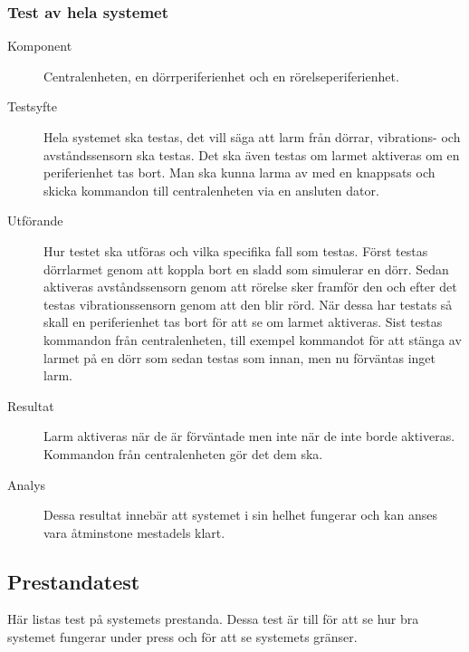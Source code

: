 \documentclass[a4paper]{article}
\begin{document}
\subsubsection{Test av hela systemet}
\begin{description}
\item[Komponent] Centralenheten, en dörrperiferienhet och en rörelseperiferienhet.

\item[Testsyfte] Hela systemet ska testas, det vill säga att larm från dörrar, vibrations- och avståndssensorn ska testas.
Det ska även testas om larmet aktiveras om en periferienhet tas bort.
Man ska kunna larma av med en knappsats och skicka kommandon till centralenheten via en ansluten dator.

\item[Utförande] Hur testet ska utföras och vilka specifika fall som testas.
Först testas dörrlarmet genom att koppla bort en sladd som simulerar en dörr.
Sedan aktiveras avståndssensorn genom att rörelse sker framför den och efter det testas vibrationssensorn genom att den blir rörd.
När dessa har testats så skall en periferienhet tas bort för att se om larmet aktiveras.
Sist testas kommandon från centralenheten, till exempel kommandot för att stänga av larmet på en dörr som sedan testas som innan, men nu förväntas inget larm.

\item[Resultat] Larm aktiveras när de är förväntade men inte när de inte borde aktiveras.
Kommandon från centralenheten gör det dem ska.

\item[Analys] Dessa resultat innebär att systemet i sin helhet fungerar och kan anses vara åtminstone mestadels klart.
\end{description}

\subsection{Prestandatest}
Här listas test på systemets prestanda.
Dessa test är till för att se hur bra systemet fungerar under press och för att se systemets gränser.
\end{document}
